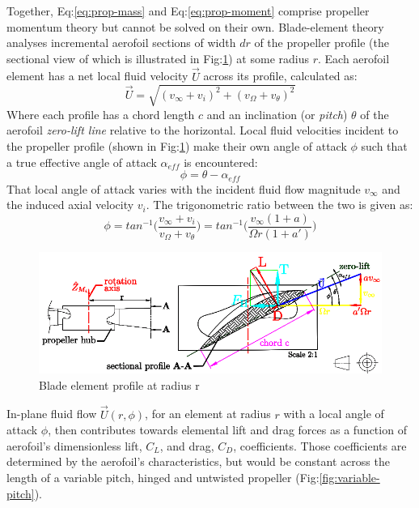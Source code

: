 Together, Eq:\ref{eq:prop-mass} and Eq:\ref{eq:prop-moment} comprise propeller momentum theory but cannot be solved on their own. Blade-element theory analyses incremental aerofoil sections of width $dr$ of the propeller profile (the sectional view of which is illustrated in Fig:\ref{fig:bem-profile}) at some radius $r$. Each aerofoil element has a net local fluid velocity $\vec{U}$ across its profile, calculated as:
\begin{equation}
\vec{U}=\sqrt{(v_\infty+v_i)^2+(v_\Omega+v_\theta)^2}
\end{equation}
Where each profile has a chord length $c$ and an inclination (or \emph{pitch}) $\theta$ of the aerofoil \emph{zero-lift line} relative to the horizontal. Local fluid velocities incident to the propeller profile (shown in Fig:\ref{fig:bem-profile}) make their own angle of attack $\phi$ such that a true effective angle of attack $\alpha_{eff}$ is encountered:
\begin{equation}
\phi=\theta-\alpha_{eff}
\end{equation}
That local angle of attack varies with the incident fluid flow magnitude $v_\infty$ and the induced axial velocity $v_i$. The trigonometric ratio between the two is given as:
\begin{equation}
\phi=tan^{-1}\bigg(\frac{v_\infty+v_i}{v_\Omega+v_\theta}\bigg)=tan^{-1}\bigg(\frac{v_\infty(1+a)}{\Omega r(1+a')}\bigg)
\end{equation}
\par
\begin{figure}[hbtp]
\vspace{-15pt}
\centering
\includegraphics[width=\textwidth]{figs/bem-profile}
\caption{Blade element profile at radius r}
\label{fig:bem-profile}
\end{figure}
In-plane fluid flow $\vec{U}(r,\phi)$, for an element at radius $r$ with a local angle of attack $\phi$, then contributes towards elemental lift and drag forces as a function of aerofoil's dimensionless lift, $C_L$, and drag, $C_D$, coefficients. Those coefficients are determined by the aerofoil's characteristics, but would be constant across the length of a variable pitch, hinged and untwisted propeller (Fig:\ref{fig:variable-pitch}).
